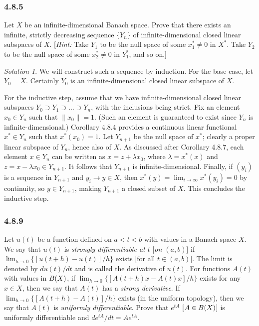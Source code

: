 \documentclass{report}
\newcommand{\norm}[1]{{\lVert #1 \rVert}}
\let\sc\relax
\newcommand{\sc}[1]{\mathscr{#1}}
\theoremstyle{remark}
\newtheorem*{solution}{Solution}
\begin{document}
\subsubsection*{4.8.5}
Let $X$ be an infinite-dimensional Banach space. Prove that there exists an infinite, strictly decreasing sequence $\{Y_n\}$ of infinite-dimensional closed linear subspaces of $X$. [\emph{Hint:} Take $Y_1$ to be the null space of some $x_1^* \ne 0$ in $X^*$. Take $Y_2$ to be the null space of some $x_2^* \ne 0$ in $Y_1^*$, and so on.]

\begin{solution}
  We will construct such a sequence by induction. For the base case, let $Y_0 = X$. Certainly $Y_0$ is an infinite-dimensional closed linear subspace of $X$.

  For the inductive step, assume that we have infinite-dimensional closed linear subspaces $Y_0 \supset Y_1 \supset \dots \supset Y_n$, with the inclusions being strict. Fix an element $x_0 \in Y_n$ such that $\norm{x_0} = 1$. (Such an element is guaranteed to exist since $Y_n$ is infinite-dimensional.) Corollary 4.8.4 provides a continuous linear functional $x^* \in Y_n$ such that $x^*(x_0) = 1$. Let $Y_{n+1}$ be the null space of $x^*$; clearly a proper linear subspace of $Y_n$, hence also of $X$. As discussed after Corollary 4.8.7, each element $x \in Y_n$ can be written as $x = z + \lambda x_0$, where $\lambda = x^*(x)$ and $z = x - \lambda x_0 \in Y_{n+1}$. It follows that $Y_{n+1}$ is infinite-dimensional. Finally, if $(y_i)$ is a sequence in $Y_{n+1}$ and $y_i \to y \in X$, then $x^*(y) = \lim_{i \to \infty} x^*(y_i) = 0$ by continuity, so $y \in Y_{n+1}$, making $Y_{n+1}$ a closed subset of $X$. This concludes the inductive step.
\end{solution}

\subsubsection*{4.8.9}
Let $u(t)$ be a function defined on $a < t < b$ with values in a Banach space $X$. We say that $u(t)$ is \emph{strongly differentiable at $t$} [\emph{on $(a,b)$}] if $\lim_{h \to 0} \{[u(t+h) - u(t)]/h\}$ exists [for all $t \in (a,b)$]. The limit is denoted by $du(t)/dt$ and is called the derivative of $u(t)$. For functions $A(t)$ with values in $\sc B(X)$, if $\lim_{h \to 0} \{[A(t+h)x - A(t)x]/h\}$ exists for any $x \in X$, then we say that $A(t)$ has a \emph{strong derivative}. If $\lim_{h \to 0} \{[A(t+h)-A(t)]/h\}$ exists (in the uniform topology), then we say that $A(t)$ is \emph{uniformly differentiable}. Prove that $e^{tA}$ [$A \in \sc B(X)$] is uniformly differentiable and $de^{tA}/dt = A e^{tA}$.
\end{document}
